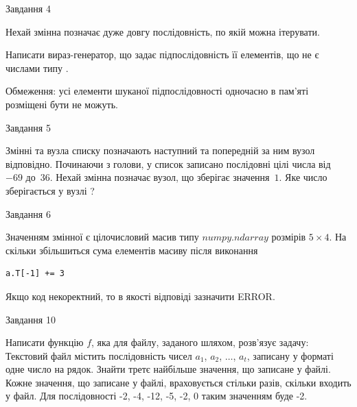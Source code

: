 \documentclass[12pt, ukrainian]{article}
\begin{document}
{               
{\begin{center}Завдання {4}\end{center}}
\vspace{-4mm}
Нехай змінна  позначає дуже довгу послідовність, по якій можна ітерувати.

Написати вираз-генератор, що задає підпослідовність її елементів, що не є числами типу .

Обмеження: усі елементи шуканої підпослідовності одночасно в пам'яті розміщені бути не можуть.\par

\vspace{10mm}
               
{\begin{center}Завдання {5}\end{center}}
\vspace{-4mm}
Змінні  та  вузла списку позначають наступний та попередній за ним вузол відповідно. Починаючи з голови, у список записано послідовні цілі числа від~$-69$ до~$36$. Нехай змінна  позначає вузол, що зберігає значення~$1$.
Яке число зберігається у вузлі  ?\par

               
{\begin{center}Завдання {6}\end{center}}
\vspace{-4mm}
Значенням змінної  є цілочисловий масив типу $numpy.ndarray$ розмірів $5{\times}4$. На скільки збільшиться сума елементів масиву  після виконання
\begin{verbatim}
a.T[-1] += 3
\end{verbatim}


Якщо код некоректний, то в якості відповіді зазначити ERROR.\par

               
{\begin{center}Завдання {10}\end{center}}
\vspace{-4mm}

Написати функцію $f$, яка для файлу, заданого шляхом, розв’язує задачу:\\ Текстовий файл містить послідовність чисел $a_1$, $a_2$, $\ldots$, $a_t$, записану у форматі одне число на рядок. Знайти третє найбільше значення, що записане у файлі. Кожне значення, що записане у файлі, враховується стільки разів, скільки входить у файл. Для послідовності -2, -4, -12, -5, -2, 0 таким значенням буде -2.

}
\end{document}
